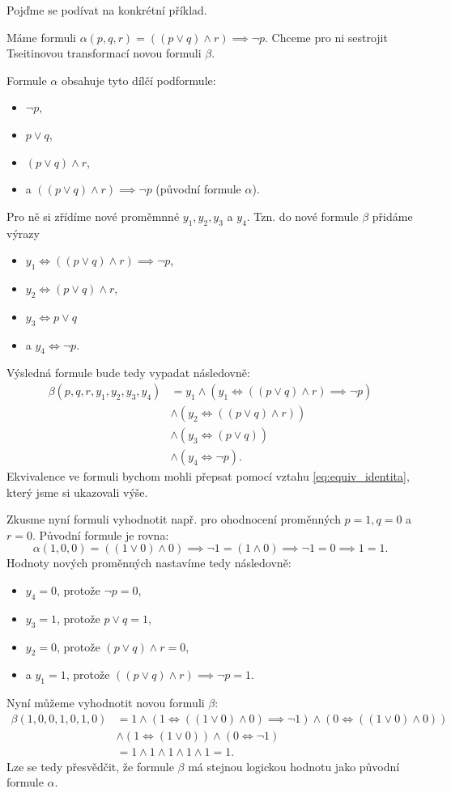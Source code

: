 Pojďme se podívat na konkrétní příklad.
\begin{example}
    Máme formuli $\alpha(p,q,r)=((p\lor q)\land r)\implies \neg p$. Chceme pro ni sestrojit Tseitinovou transformací novou formuli $\beta$.
    
    Formule $\alpha$ obsahuje tyto dílčí podformule:
    \begin{itemize}
        \item $\neg p$,
        \item $p\lor q$,
        \item $(p\lor q)\land r$,
        \item a $((p\lor q)\land r)\implies \neg p$ (původní formule $\alpha$).
    \end{itemize}
    Pro ně si zřídíme nové proměmnné $y_1,y_2,y_3$ a $y_4$. Tzn. do nové formule $\beta$ přidáme výrazy
    \begin{itemize}
        \item $y_1\iff((p\lor q)\land r)\implies \neg p$,
        \item $y_2\iff(p\lor q)\land r$,
        \item $y_3\iff p\lor q$
        \item a $y_4\iff\neg p$.
    \end{itemize}
    Výsledná formule bude tedy vypadat následovně:
    \begin{align*}
        \beta(p,q,r,y_1,y_2,y_3,y_4)&=y_1\land(y_1\iff((p\lor q)\land r)\implies \neg p)\\
        &\land(y_2\iff((p\lor q)\land r))\\
        &\land(y_3\iff (p\lor q))\\
        &\land(y_4\iff\neg p).
    \end{align*}
    Ekvivalence ve formuli bychom mohli přepsat pomocí vztahu \eqref{eq:equiv_identita}, který jsme si ukazovali výše.

    Zkusme nyní formuli vyhodnotit např. pro ohodnocení proměnných $p=1,q=0$ a $r=0$. Původní formule je rovna:
    \[\alpha(1,0,0)=((1\lor 0)\land 0)\implies\neg 1=(1\land 0)\implies\neg 1=0\implies 1=1.\]
    Hodnoty nových proměnných nastavíme tedy následovně:
    \begin{itemize}
        \item $y_4=0$, protože $\neg p=0$,
        \item $y_3=1$, protože $p\lor q=1$,
        \item $y_2=0$, protože $(p\lor q)\land r=0$,
        \item a $y_1=1$, protože $((p\lor q)\land r)\implies \neg p=1$.
    \end{itemize}
    Nyní můžeme vyhodnotit novou formuli $\beta$:
    \begin{align*}
        \beta(1,0,0,1,0,1,0)&=1\land(1\iff((1\lor 0)\land 0)\implies\neg 1)\land(0\iff((1\lor 0)\land 0))\\
        &\land(1\iff(1\lor 0))\land(0\iff\neg 1)\\
        &=1\land 1\land 1\land 1\land 1=1.
    \end{align*}
    Lze se tedy přesvědčit, že formule $\beta$ má stejnou logickou hodnotu jako původní formule $\alpha$.
\end{example}

